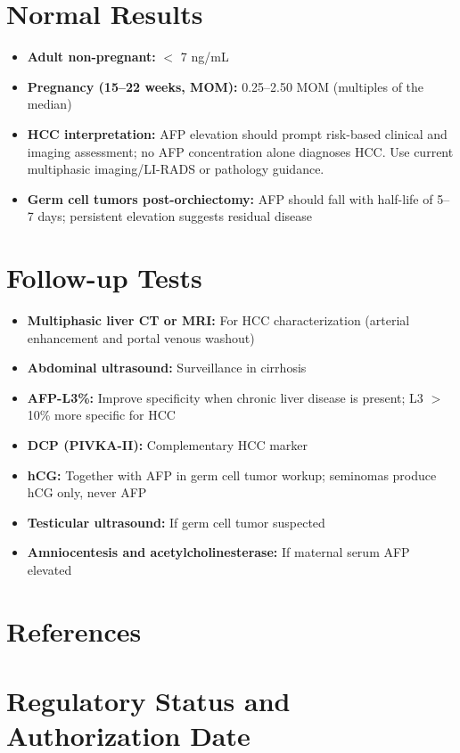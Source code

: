 \section*{Normal Results}
\begin{itemize}
  \item \textbf{Adult non-pregnant:} $<$ 7 ng/mL
  \item \textbf{Pregnancy (15--22 weeks, MOM):} 0.25--2.50 MOM (multiples of the median)
  \item \textbf{HCC interpretation:} AFP elevation should prompt risk-based clinical and imaging assessment; no AFP concentration alone diagnoses HCC. Use current multiphasic imaging/LI-RADS or pathology guidance.
  \item \textbf{Germ cell tumors post-orchiectomy:} AFP should fall with half-life of 5--7 days; persistent elevation suggests residual disease
\end{itemize}

\section*{Follow-up Tests}
\begin{itemize}
  \item \textbf{Multiphasic liver CT or MRI:} For HCC characterization (arterial enhancement and portal venous washout)
  \item \textbf{Abdominal ultrasound:} Surveillance in cirrhosis
  \item \textbf{AFP-L3\%:} Improve specificity when chronic liver disease is present; L3 $>$ 10\% more specific for HCC \cite{li2001afpl3}
  \item \textbf{DCP (PIVKA-II):} Complementary HCC marker
  \item \textbf{hCG:} Together with AFP in germ cell tumor workup; seminomas produce hCG only, never AFP
  \item \textbf{Testicular ultrasound:} If germ cell tumor suspected
  \item \textbf{Amniocentesis and acetylcholinesterase:} If maternal serum AFP elevated
\end{itemize}

\section*{References}



\clearpage
\section*{Regulatory Status and Authorization Date}

\clearpage
